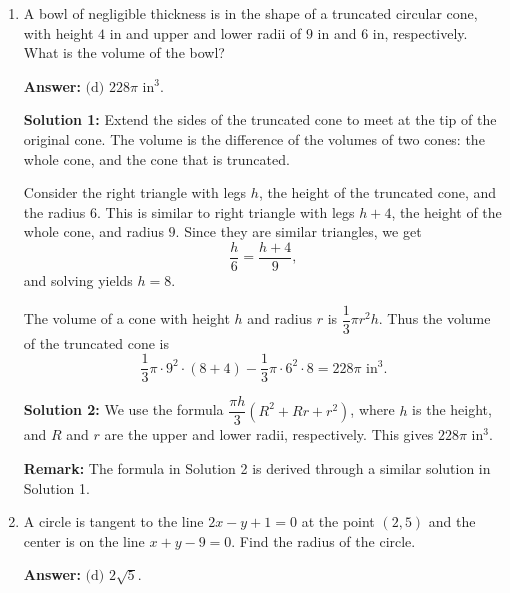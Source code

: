 \documentclass[11pt,paper=letter]{scrartcl}
\begin{document}
\begin{enumerate}[left=0pt]
\item A bowl of negligible thickness is in the shape of a truncated circular cone, with height $4 \text{ in}$ and upper and lower radii of $9 \text{ in}$ and $6 \text{ in}$, respectively. What is the volume of the bowl? 


\textbf{Answer:} $\boxed{\text{(d) }228\pi\text{ in}^3}$.

\textbf{Solution 1:} Extend the sides of the truncated cone to meet at the tip of the original cone. The volume is the difference of the volumes of two cones: the whole cone, and the cone that is truncated.
\begin{center}
\end{center}

Consider the right triangle with legs $h$, the height of the truncated cone, and the radius $6$. This is similar to right triangle with legs $h + 4$, the height of the whole cone, and radius $9$. Since they are similar triangles, we get $$\frac{h}{6} = \frac{h+4}9,$$ and solving yields $h = 8$. 

The volume of a cone with height $h$ and radius $r$ is $\dfrac13\pi r^2h$. Thus the volume of the truncated cone is $$\frac13\pi\cdot9^2\cdot(8+4) - \frac13\pi\cdot6^2\cdot8 = 228\pi\text{ in}^3.$$

\textbf{Solution 2:} We use the formula $\dfrac{\pi h}3(R^2 + Rr + r^2)$, where $h$ is the height, and $R$ and $r$ are the upper and lower radii, respectively. This gives $228\pi\text{ in}^3$.

\textbf{Remark:} The formula in Solution 2 is derived through a similar solution in Solution 1.

\item A circle is tangent to the line $2x - y + 1 = 0$ at the point $(2, 5)$ and the center is on the line $x + y - 9 = 0$. Find the radius of the circle.


\textbf{Answer:} $\boxed{\text{(d) }2\sqrt5}$.


\end{enumerate}
\end{document}
